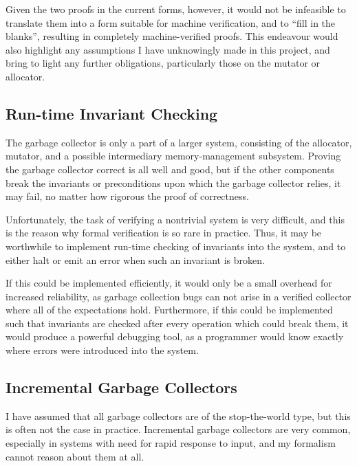 Given the two proofs in the current forms, however, it would not be
infeasible to translate them into a form suitable for machine
verification, and to ``fill in the blanks'', resulting in completely
machine-verified proofs. This endeavour would also highlight any
assumptions I have unknowingly made in this project, and bring to
light any further obligations, particularly those on the mutator or
allocator.

\subsection{Run-time Invariant Checking}
\label{sec:conclusion-further-invariants}

The garbage collector is only a part of a larger system, consisting of
the allocator, mutator, and a possible intermediary memory-management
subsystem. Proving the garbage collector correct is all well and good,
but if the other components break the invariants or preconditions upon
which the garbage collector relies, it may fail, no matter how
rigorous the proof of correctness.

Unfortunately, the task of verifying a nontrivial system is very
difficult, and this is the reason why formal verification is so rare
in practice. Thus, it may be worthwhile to implement run-time checking
of invariants into the system, and to either halt or emit an error
when such an invariant is broken.

If this could be implemented efficiently, it would only be a small
overhead for increased reliability, as garbage collection bugs can not
arise in a verified collector where all of the expectations
hold. Furthermore, if this could be implemented such that invariants
are checked after every operation which could break them, it would
produce a powerful debugging tool, as a programmer would know exactly
where errors were introduced into the system.

\subsection{Incremental Garbage Collectors}
\label{sec:conclusion-further-incremental}

I have assumed that all garbage collectors are of the stop-the-world
type, but this is often not the case in practice. Incremental garbage
collectors are very common, especially in systems with need for rapid
response to input, and my formalism cannot reason about them at
all.

